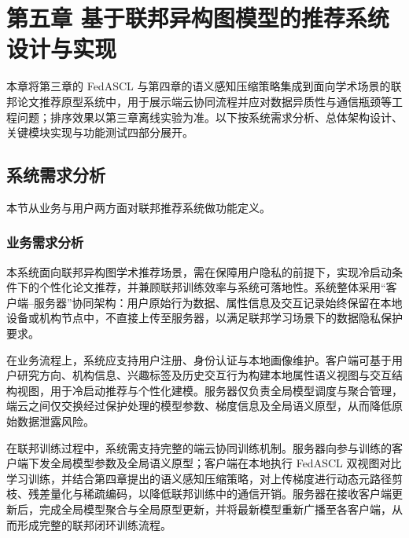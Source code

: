 \newpage

\section{第五章\texorpdfstring{\quad}{} 基于联邦异构图模型的推荐系统设计与实现}
\label{chap:system_design}
\setcounter{section}{5}
\setcounter{subsection}{0}

本章将第三章的 FedASCL 与第四章的语义感知压缩策略集成到面向学术场景的联邦论文推荐原型系统中，用于展示端云协同流程并应对数据异质性与通信瓶颈等工程问题；排序效果以第三章离线实验为准。以下按系统需求分析、总体架构设计、关键模块实现与功能测试四部分展开。

\subsection{系统需求分析}
\label{sec:sys_requirements}

本节从业务与用户两方面对联邦推荐系统做功能定义。

\subsubsection{业务需求分析}

本系统面向联邦异构图学术推荐场景，需在保障用户隐私的前提下，实现冷启动条件下的个性化论文推荐，并兼顾联邦训练效率与系统可落地性。系统整体采用“客户端–服务器”协同架构：用户原始行为数据、属性信息及交互记录始终保留在本地设备或机构节点中，不直接上传至服务器，以满足联邦学习场景下的数据隐私保护要求。

在业务流程上，系统应支持用户注册、身份认证与本地画像维护。客户端可基于用户研究方向、机构信息、兴趣标签及历史交互行为构建本地属性语义视图与交互结构视图，用于冷启动推荐与个性化建模。服务器仅负责全局模型调度与聚合管理，端云之间仅交换经过保护处理的模型参数、梯度信息及全局语义原型，从而降低原始数据泄露风险。

在联邦训练过程中，系统需支持完整的端云协同训练机制。服务器向参与训练的客户端下发全局模型参数及全局语义原型；客户端在本地执行 FedASCL 双视图对比学习训练，并结合第四章提出的语义感知压缩策略，对上传梯度进行动态元路径剪枝、残差量化与稀疏编码，以降低联邦训练中的通信开销。服务器在接收客户端更新后，完成全局模型聚合与全局原型更新，并将最新模型重新广播至各客户端，从而形成完整的联邦闭环训练流程。

